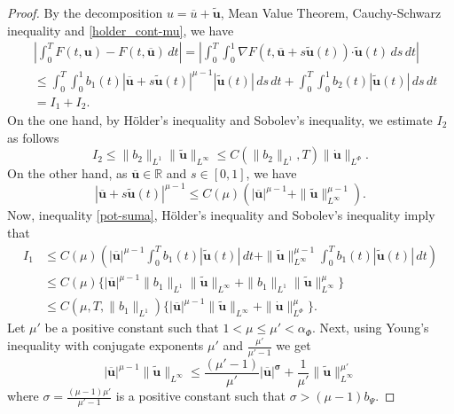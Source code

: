 \documentclass[twoside]{article}
\theoremstyle{remark}
\newcommand{\orlnor}{\|_{L^{\Phi}}}
\renewcommand{\b}[1]{\boldsymbol{#1}}
\newcommand{\rr}{\mathbb{R}}
\newcommand{\ccdot}{\b{\cdot}}
\renewcommand{\leq}{\leqslant}
\begin{document}
\begin{proof} 
By the decomposition $u=\overline{u}+\b{\tilde{u}}$,  Mean Value Theorem, Cauchy-Schwarz inequality 
and \eqref{holder_cont-mu}, we have
\begin{equation}\label{cota-diferencia-F}
\begin{split}
&\left|\int_0^T F(t,\b{u})-F(t,\b{\overline{u}})\,dt\right|=
\left|\int_0^T \int_0^1 \nabla F(t,\b{\overline{u}}+s\b{\tilde{u}}(t))\ccdot \b{\tilde{u}}(t) \,ds \,dt\right|
\\
&\leq \int_0^T \int_0^1 b_1(t)|\b{\overline{u}}+s\b{\tilde{u}}(t)|^{\mu-1}|\b{\tilde{u}}(t)|\,ds\,dt+
\int_0^T \int_0^1 b_2(t)|\b{\tilde{u}}(t)|\,ds\,dt
\\
&=I_1+I_2.
\end{split}
\end{equation}
On the one hand, by H\"older's inequality and Sobolev's inequality, we estimate $I_2$ as follows
\begin{equation}\label{cota-i2}
I_2\leq \|b_2\|_{L^1} \|\b{\tilde{u}}\|_{L^{\infty}}\leq
C(\|b_2\|_{L^1}, T)\|\b{\dot u}\orlnor.
\end{equation}
 On the other hand, as $\b{\overline{u}}\in\rr$ and $s\in [0,1]$, we have
\begin{equation}\label{pot-suma}
|\b{\overline{u}}+s\b{\tilde{u}}(t)|^{\mu-1}\leq
C(\mu)(|\b{\overline{u}}|^{\mu-1}+\|\b{\tilde{u}}\|_{L^{\infty}}^{\mu-1}).
\end{equation}
Now,  inequality \eqref{pot-suma}, H\"older's inequality and Sobolev's inequality imply that
\begin{equation}\label{cota-i1}
\begin{split}
I_1&\leq 
C(\mu)\left(|\b{\overline{u}}|^{\mu-1} \int_0^T b_1(t) |\b{\tilde{u}}(t)|\,dt+
\|\b{\tilde{u}}\|^{\mu-1}_{L^{\infty}} \int_0^T b_1(t)|\b{\tilde{u}}(t)| \,dt\right)
\\
&\leq C(\mu)\bigg\{ |\b{\overline{u}}|^{\mu-1} \|b_1\|_{L^1} \|\b{\tilde{u}}\|_{L^{\infty}}+
 \|b_1\|_{L^1}\|\b{\tilde{u}}\|^{\mu}_{L^\infty}\bigg\}
\\
&\leq C(\mu,T, \|b_1\|_{L^1} )\bigg\{ |\b{\overline{u}}|^{\mu-1} \|\b{\tilde{u}}\|_{L^{\infty}}+ \|\b{\dot u}\orlnor^{\mu}\bigg\}.
\end{split}
\end{equation}
Let $\mu'$ be a positive constant such that $1<\mu\leq \mu'<\alpha_{\Phi}$. 
Next, using Young's inequality with conjugate exponents $\mu'$ and $\frac{\mu'}{\mu'-1}$ 
 we get
\begin{equation}\label{cota-i1-parcial}
|\b{\overline{u}}|^{\mu-1}  \|\b{\tilde{u}}\|_{L^{\infty}}
\leq \frac{(\mu'-1)}{\mu'}|\b{\overline{u}|^{\sigma}}
+\frac{1}{\mu'}\|\b{\tilde{u}}\|_{L^{\infty}}^{\mu'}
\end{equation}
where $\sigma=\frac{(\mu-1) \mu'}{\mu'-1}$ is a positive constant such that $\sigma>(\mu-1)b_{\Psi}$.


\end{proof}
\end{document}
